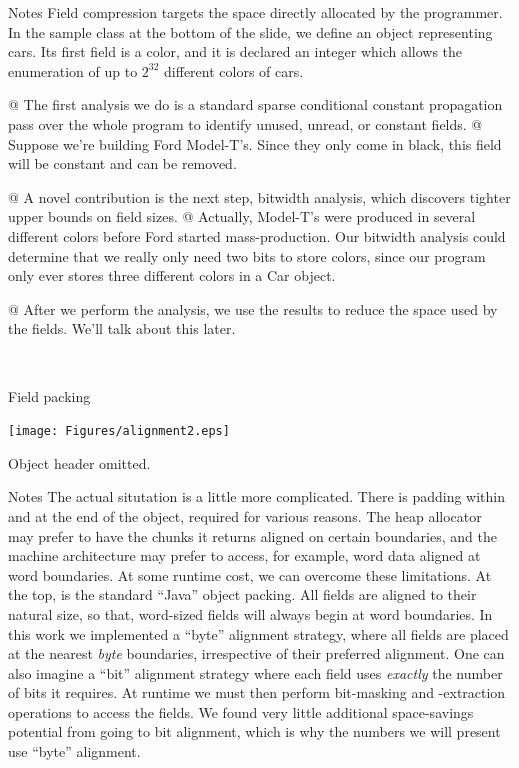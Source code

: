 \documentclass[%
pdf,
colorBG,
slideColor,
nototal,
oqe
]{prosper}
\newenvironment{talknotes}{\begin{slide}{Notes}\tiny}{\end{slide}}
\begin{document}
\begin{talknotes}
Field compression targets the space directly allocated by the
programmer.  In the sample class at the bottom of the slide, we
define an object representing cars.  Its first field is a color,
and it is declared an integer which allows the enumeration of up
to $2^{32}$ different colors of cars.

@ The first analysis we do is a standard sparse conditional constant
propagation pass over the whole program to identify unused, unread,
or constant fields.  @ Suppose we're building Ford Model-T's.
Since they only come in black, this field will be constant and
can be removed.

@ A novel contribution is the next step, bitwidth analysis, which discovers
tighter upper bounds on field sizes.  @  Actually, Model-T's were
produced in several different colors before Ford started
mass-production.  Our bitwidth analysis could determine that
we really only need two bits to store colors, since our program
only ever stores three different colors in a Car object.

@ After we perform the analysis, we use the results to
reduce the space used by the fields.  We'll talk about this later.

~%
\end{talknotes}

\begin{slide}{Field packing}
\begin{center}
\vspace{0.75cm}
\texttt{[image: Figures/alignment2.eps]}

\small Object header omitted.
\end{center}
\end{slide}

\begin{talknotes}
The actual situtation is a little more complicated.  There is padding
within and at the end of the object, required for various reasons.
The heap allocator may prefer to have the chunks it returns aligned
on certain boundaries, and the machine architecture may prefer to
access, for example, word data aligned at word boundaries.  At
some runtime cost, we can overcome these limitations.  At the top, is
the standard ``Java'' object packing.  All fields are aligned to their
natural size, so that, word-sized fields will always begin at word
boundaries.  In this work we implemented a ``byte'' alignment
strategy, where all fields are placed at the nearest \emph{byte}
boundaries, irrespective of their preferred alignment.  One can also
imagine a ``bit'' alignment strategy where each field uses
\emph{exactly} the number of bits it requires.  At runtime we must
then perform bit-masking and -extraction operations to access the
fields.  We found very little additional space-savings potential from
going to bit alignment, which is why the numbers we will present use
``byte'' alignment.

~%
\end{talknotes}
\end{document}
